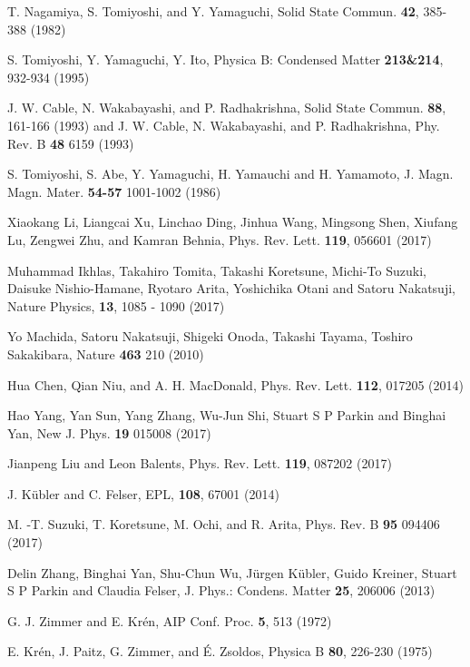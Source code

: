 \documentclass[prb,twocolumn,showpacs,preprintnumbers,amsmath,amssymb]{revtex4}
\begin{document}
\begin{thebibliography}{}
T. Nagamiya, S. Tomiyoshi, and Y. Yamaguchi, Solid State Commun. {\bf 42}, 385-388 (1982) 

S. Tomiyoshi, Y. Yamaguchi, Y. Ito, Physica B: Condensed Matter {\bf 213\&214}, 932-934 (1995)

J. W. Cable, N. Wakabayashi, and P. Radhakrishna, Solid State Commun. {\bf 88}, 161-166 (1993) and J. W. Cable, N. Wakabayashi, and P. Radhakrishna, Phy. Rev. B {\bf 48} 6159 (1993)  

S. Tomiyoshi, S. Abe, Y. Yamaguchi, H. Yamauchi and H. Yamamoto, J. Magn. Magn. Mater. {\bf 54-57} 1001-1002 (1986)




Xiaokang Li, Liangcai Xu, Linchao Ding, Jinhua Wang, Mingsong Shen, Xiufang Lu, Zengwei Zhu, and Kamran Behnia, Phys. Rev. Lett. {\bf 119}, 056601 (2017)

Muhammad Ikhlas, Takahiro Tomita, Takashi Koretsune, Michi-To Suzuki, Daisuke Nishio-Hamane, Ryotaro Arita, Yoshichika Otani and Satoru Nakatsuji, Nature Physics, {\bf 13}, 1085 - 1090 (2017)




Yo Machida, Satoru Nakatsuji, Shigeki Onoda, Takashi Tayama, Toshiro Sakakibara, Nature {\bf 463} 210 (2010)


Hua Chen, Qian Niu, and A. H. MacDonald, Phys. Rev. Lett. {\bf 112}, 017205 (2014)

Hao Yang, Yan Sun, Yang Zhang, Wu-Jun Shi, Stuart S P Parkin and Binghai Yan, New J. Phys. {\bf 19} 015008 (2017)

Jianpeng Liu and Leon Balents, Phys. Rev. Lett. {\bf 119}, 087202 (2017)

J. K{\"u}bler and C. Felser, EPL, {\bf 108}, 67001 (2014)

M. -T. Suzuki, T. Koretsune, M. Ochi, and R. Arita, Phys. Rev. B {\bf 95} 094406 (2017)

Delin Zhang, Binghai Yan, Shu-Chun Wu, J{\"u}rgen K{\"u}bler, Guido Kreiner, Stuart S P Parkin and Claudia Felser, J. Phys.: Condens. Matter {\bf 25}, 206006 (2013)




G. J. Zimmer and E. Kr{\'e}n, AIP Conf. Proc. {\bf 5}, 513 (1972)

E. Kr{\'e}n, J. Paitz, G. Zimmer, and {\'E}. Zsoldos, Physica B {\bf 80}, 226-230 (1975)



\end{thebibliography}
\end{document}
